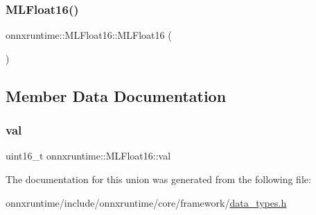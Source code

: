 \mbox{\label{uniononnxruntime_1_1MLFloat16_a11f4ab404dd01c8f05b135635b0e9fc7}} 
\subsubsection{\texorpdfstring{M\+L\+Float16()}{MLFloat16()}\hspace{0.1cm}{\footnotesize\ttfamily [2/2]}}
{\footnotesize\ttfamily onnxruntime\+::\+M\+L\+Float16\+::\+M\+L\+Float16 (\begin{DoxyParamCaption}{ }\end{DoxyParamCaption})\hspace{0.3cm}{\ttfamily [inline]}}



\subsection{Member Data Documentation}
\mbox{\label{uniononnxruntime_1_1MLFloat16_a26dd15c6336cbdeb71cbd86a6cd096d8}} 
\subsubsection{\texorpdfstring{val}{val}}
{\footnotesize\ttfamily uint16\+\_\+t onnxruntime\+::\+M\+L\+Float16\+::val}



The documentation for this union was generated from the following file\+:\begin{DoxyCompactItemize}
\item 
onnxruntime/include/onnxruntime/core/framework/\mbox{\hyperlink{data__types_8h}{data\+\_\+types.\+h}}\end{DoxyCompactItemize}
